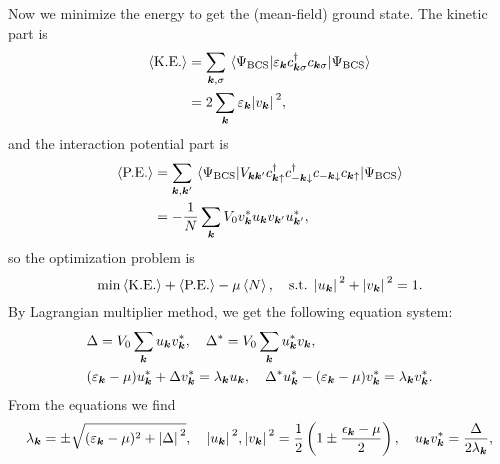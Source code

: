 \documentclass[hyperref, a4paper]{article}
\begin{document}
Now we minimize the energy to get the (mean-field) ground state. 
The kinetic part is 
\begin{equation}
    \begin{aligned}
        \expval{\text{K.E.}} &= \sum_{\vb*{k}, \sigma} 
        \expval{\varepsilon_{\vb*{k}} c^\dagger_{\vb*{k} \sigma} c_{\vb*{k} \sigma}}{\Psi_{\text{BCS}}} \\
        &= 2 \sum_{\vb*{k}} \varepsilon_{\vb*{k}} \abs*{v_{\vb*{k}}}^2,
    \end{aligned}
    \label{eq:sc-ke}
\end{equation}
and the interaction potential part is 
\begin{equation}
    \begin{aligned}
        \expval{\text{P.E.}} &= \sum_{\vb*{k}, \vb*{k}'} 
        \expval{
            V_{\vb*{k} \vb*{k}'} c^\dagger_{\vb*{k} \uparrow}
            c^\dagger_{- \vb*{k} \downarrow}
            c_{- \vb*{k} \downarrow}
            c_{\vb*{k} \uparrow}
        }{\Psi_{\text{BCS}}} \\
        &= - \frac{1}{N} \sum_{\vb*{k}} V_0 v^*_{\vb*{k}} u_{\vb*{k}} v_{\vb*{k}'} u_{\vb*{k}'}^*,
    \end{aligned}
\end{equation}
so the optimization problem is 
\begin{equation}
    \min \expval{\text{K.E.}} + \expval{\text{P.E.}} - \mu \expval{N}, 
    \quad \text{s.t. $\abs*{u_{\vb*{k}}}^2 + \abs*{v_{\vb*{k}}}^2 = 1$}.
\end{equation}
By Lagrangian multiplier method, 
we get the following equation system: 
\begin{equation}
    \begin{aligned}
        &\Delta = V_0 \sum_{\vb*{k}} u_{\vb*{k}} v^*_{\vb*{k}}, \quad 
        \Delta^* = V_0 \sum_{\vb*{k}} u_{\vb*{k}}^* v_{\vb*{k}}, \quad \\
        &(\varepsilon_{\vb*{k}} - \mu) u^*_{\vb*{k}} + \Delta v^*_{\vb*{k}} = \lambda_{\vb*{k}} u_{\vb*{k}}, \quad 
        \Delta^* u^*_{\vb*{k}} - (\varepsilon_{\vb*{k}} - \mu) v^*_{\vb*{k}} = \lambda_{\vb*{k}} v^*_{\vb*{k}}.
    \end{aligned}
\end{equation}
From the equations we find 
\begin{equation}
    \lambda_{\vb*{k}} = \pm \sqrt{
        (\varepsilon_{\vb*{k}} - \mu)^2 + \abs*{\Delta}^2
    }, \quad 
    \abs*{u_{\vb*{k}}}^2, \abs*{v_{\vb*{k}}}^2 = 
    \frac{1}{2} \left(
        1 \pm \frac{\epsilon_{\vb*{k}} - \mu}{2}
    \right), \quad 
    u_{\vb*{k}} v^*_{\vb*{k}} = \frac{\Delta}{2 \lambda_{\vb*{k}}},
\end{equation}
\end{document}
